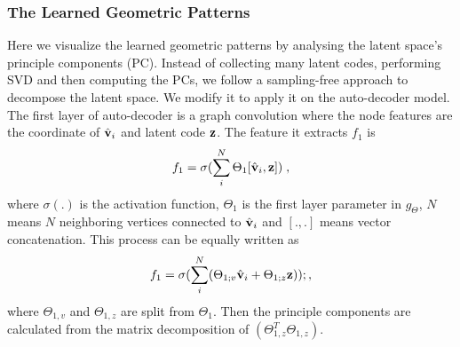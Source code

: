 \subsubsection{The Learned Geometric Patterns}
Here we visualize the learned geometric patterns by analysing the latent space's principle components (PC).
Instead of collecting many latent codes, performing SVD and then computing the PCs, we follow a sampling-free approach \cite{ai.Shen2021b} to decompose the latent space. We modify it to apply it on the auto-decoder model.
The first layer of auto-decoder is a graph convolution where the node features are the coordinate of $\hat{\mathbf{v}}_i$ and latent code $\mathbf{z}$. The feature it extracts $f_1$ is
\begin{equation}
    f_1 = \sigma(\sum_i^N\Theta_1 [\hat{\mathbf{v}}_i, \mathbf{z}])\;,
\end{equation}
where $\sigma(.)$ is the activation function, $\Theta_1$ is the first layer parameter in $g_\Theta$, $N$ means $N$ neighboring vertices connected to $\hat{\mathbf{v}}_i$ and $[.,.]$ means vector concatenation.
This process can be equally written as
\begin{equation}
    f_1 = \sigma(\sum_i^N(\Theta_{1;v}\hat{\mathbf{v}}_i + \Theta_{1;z} \mathbf{z}))\\;,
\end{equation}
where $\Theta_{1,v}$ and $\Theta_{1,z}$ are split from $\Theta_1$.
Then the principle components are calculated from the matrix decomposition of $(\Theta_{1,z}^T \Theta_{1,z})$.

